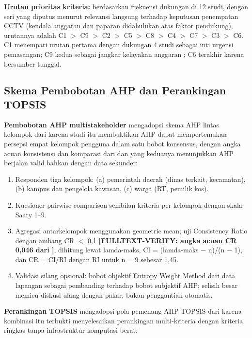 \documentclass[conference]{IEEEtran}
\begin{document}
\textbf{Urutan prioritas kriteria:} berdasarkan frekuensi dukungan di 12 studi, dengan seri yang diputus menurut relevansi langsung terhadap keputusan penempatan CCTV (kendala anggaran dan paparan didahulukan atas faktor pendukung), urutannya adalah C1 $>$ C9 $>$ C2 $>$ C5 $>$ C8 $>$ C4 $>$ C7 $>$ C3 $>$ C6. C1 menempati urutan pertama dengan dukungan 4 studi sebagai inti urgensi pemasangan; C9 kedua sebagai jangkar kelayakan anggaran \cite{wang2025}; C6 terakhir karena bersumber tunggal.

\subsection{Skema Pembobotan AHP dan Perankingan TOPSIS}

\textbf{Pembobotan AHP multistakeholder} mengadopsi skema AHP lintas kelompok dari \cite{ahmed2022} karena studi itu membuktikan AHP dapat mempertemukan persepsi empat kelompok pengguna dalam satu bobot konsensus, dengan angka acuan konsistensi dan komparasi dari \cite{baddour2026} dan \cite{shiddiqy2025} yang keduanya menunjukkan AHP berjalan valid bahkan dengan data sekunder:

\begin{enumerate}
\item Responden tiga kelompok: (a) pemerintah daerah (dinas terkait, kecamatan), (b) kampus dan pengelola kawasan, (c) warga (RT, pemilik kos).
\item Kuesioner pairwise comparison sembilan kriteria per kelompok dengan skala Saaty 1--9.
\item Agregasi antarkelompok menggunakan geometric mean; uji Consistency Ratio dengan ambang CR $<$ 0,1 \textbf{[FULLTEXT-VERIFY: angka acuan CR 0,046 dari \cite{baddour2026}]}, dihitung lewat lamda-maks, CI = (lamda-maks $-$ n)/(n $-$ 1), dan CR = CI/RI dengan RI untuk n = 9 sebesar 1,45.
\item Validasi silang opsional: bobot objektif Entropy Weight Method dari data lapangan \cite{yuhang2025} sebagai pembanding terhadap bobot subjektif AHP; selisih besar memicu diskusi ulang dengan pakar, bukan penggantian otomatis.
\end{enumerate}

\textbf{Perankingan TOPSIS} mengadopsi pola pemenang AHP-TOPSIS dari \cite{kanj2024} karena kombinasi itu terbukti menyelesaikan perankingan multi-kriteria dengan kriteria ringkas tanpa infrastruktur komputasi berat:
\end{document}
